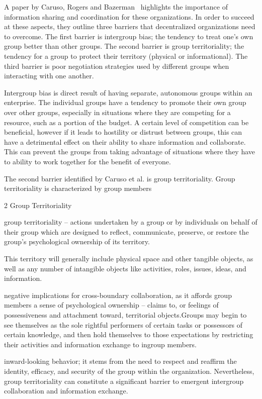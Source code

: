 A paper by Caruso, Rogers and Bazerman~\cite{caruso2008boundaries} highlights the importance of information sharing and coordination for these organizations. In order to succeed at these aspects, they outline three barriers that decentralized organizations need to overcome. The first barrier is intergroup bias; the tendency to treat one's own group better than other groups. The second barrier is group territoriality; the tendency for a group to protect their territory (physical or informational). The third barrier is poor negotiation strategies used by different groups when interacting with one another. 

Intergroup bias is direct result of having separate, autonomous groups within an enterprise. The individual groups have a tendency to promote their own group over other groups, especially in situations where they are competing for a resource, such as a portion of the budget. A certain level of competition can be beneficial, however if it leads to hostility or distrust between groups, this can have a detrimental effect on their ability to share information and collaborate. This can prevent the groups from taking advantage of situations where they have to ability to work together for the benefit of everyone. 

The second barrier identified by Caruso et al. is group territoriality. Group territoriality is characterized by group members 
    
    2 Group Territoriality
    
    
group territoriality – actions undertaken by a group or by individuals on behalf of their group which are designed to reflect, communicate, preserve, or restore the group's psychological ownership of its territory.

This territory will generally include physical space and other tangible objects, as well as any number of intangible objects like activities, roles, issues, ideas, and information.

negative implications for cross-boundary collaboration, as it affords group members a sense of psychological ownership – claims to, or feelings of possessiveness and attachment toward, territorial objects.Groups may begin to see themselves as the sole rightful performers of certain tasks or possessors of certain knowledge, and then hold themselves to those expectations by restricting their activities and information exchange to ingroup members.

inward-looking behavior; it stems from the need to respect and reaffirm the identity, efficacy, and security of the group within the organization. Nevertheless, group territoriality can constitute a significant barrier to emergent intergroup collaboration and information exchange.

